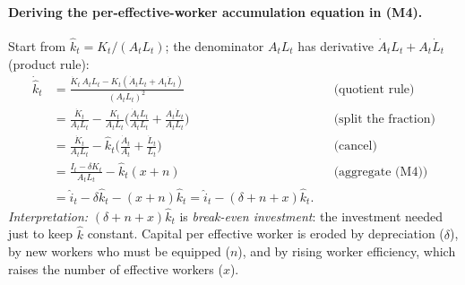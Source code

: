\paragraph{Deriving the per-effective-worker accumulation equation in (M4).} Start from $\hat k_t = K_t/(A_tL_t)$; the denominator $A_tL_t$ has derivative $\dot A_tL_t+A_t\dot L_t$ (product rule):
\begin{align*}
\dot{\hat k}_t &= \frac{\dot K_t\,A_tL_t - K_t(\dot A_tL_t + A_t\dot L_t)}{(A_tL_t)^2} && \text{(quotient rule)}\\
&= \frac{\dot K_t}{A_tL_t} - \frac{K_t}{A_tL_t}\Big(\frac{\dot A_tL_t}{A_tL_t}+\frac{A_t\dot L_t}{A_tL_t}\Big) && \text{(split the fraction)}\\
&= \frac{\dot K_t}{A_tL_t} - \hat k_t\Big(\frac{\dot A_t}{A_t}+\frac{\dot L_t}{L_t}\Big) && \text{(cancel)}\\
&= \frac{I_t-\delta K_t}{A_tL_t} - \hat k_t(x+n) && \text{(aggregate (M4))}\\
&= \hat i_t - \delta\hat k_t - (x+n)\hat k_t = \hat i_t-(\delta+n+x)\hat k_t .
\end{align*}
\textit{Interpretation:} $(\delta+n+x)\hat k_t$ is \emph{break-even investment}: the investment needed just to keep $\hat k$ constant. Capital per effective worker is eroded by depreciation ($\delta$), by new workers who must be equipped ($n$), and by rising worker efficiency, which raises the number of effective workers ($x$).

